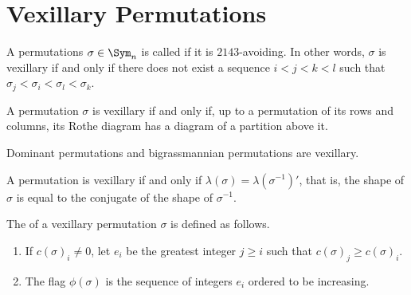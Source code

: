 \documentclass[11pt,leqno,oneside]{amsart}
\numberwithin{thm}{section}
\begin{document}
\section{Vexillary Permutations}
\begin{defn}
  A permutations \(\sigma \in \Sym_n\) is called  if it
  is \(2143\)-avoiding. In other words, \(\sigma\) is vexillary if and
  only if there does not exist a sequence \(i < j < k < l\) such that
  \(\sigma_j < \sigma_i < \sigma_l < \sigma_k\).
\end{defn}
\begin{lem}
  A permutation \(\sigma\) is vexillary if and only if, up to a
  permutation of its rows and columns, its Rothe diagram has a diagram
  of a partition above it.
\end{lem}
\begin{cor}
  Dominant permutations and bigrassmannian permutations are vexillary.
\end{cor}
\begin{prop}
  A permutation is vexillary if and only if \(\lambda(\sigma) =
  \lambda(\sigma^{-1})'\), that is, the shape of \(\sigma\) is equal
  to the conjugate of the shape of \(\sigma^{-1}\).
\end{prop}
\begin{defn}
  The  of a vexillary permutation \(\sigma\) is defined as
  follows.
  \begin{enumerate}
  \item If \(c(\sigma)_i \neq 0\), let \(e_i\) be the greatest integer
    \(j \geq i\) such that \(c(\sigma)_j \geq c(\sigma)_i\).
  \item The flag \(\phi(\sigma)\) is the sequence of integers \(e_i\)
    ordered to be increasing. 
  \end{enumerate}
\end{defn}
\end{document}
